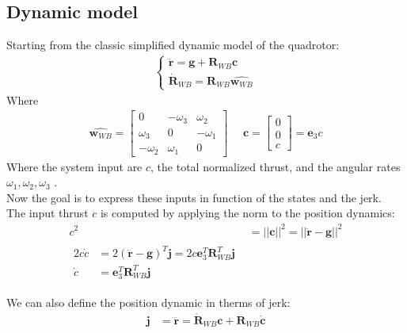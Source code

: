 \subsection{Dynamic model}
Starting from the classic simplified dynamic model of the quadrotor:
\begin{align}
\begin{cases}
\ddot{\boldsymbol{r}} = \boldsymbol{g} + \boldsymbol{R}_{WB}\boldsymbol{c}  \\[10pt]
\dot{\boldsymbol{R}}_{WB} = \boldsymbol{R}_{WB}\hat{\boldsymbol{w}_{WB}}
\end{cases}
\label{eq:dynamic_jerk}
\end{align}
Where 
\begin{align}
\hat{\boldsymbol{w}_{WB}} =
{\begin{bmatrix}
0 & -\omega_3 & \omega_2 \\[10pt]
\omega_3 & 0 & -\omega_1 \\[10pt]
-\omega_2 & \omega_1  & 0
\end{bmatrix}} \ \ \ \ \ \ \boldsymbol{c} = 
{\begin{bmatrix}
0 \\[10pt]
0 \\[10pt]
c
\end{bmatrix}} = \boldsymbol{e}_3c
\end{align}
Where the system input are  $c$, the total normalized thrust, and the angular rates $\omega_1,\omega_2,\omega_3$ .\\

Now the goal is to express these inputs in function of the states and the jerk.\\
 
The input thrust $c$ is computed by applying the norm to the position dynamics:
\begin{align}
c^2 &= ||\boldsymbol{c}||^2 =  ||\ddot{\boldsymbol{r}} - \boldsymbol{g}||^2 \\[20pt] \label{eq:thrust_from_jerk}
\begin{split}
2c\dot{c} &= 2(\ddot{\boldsymbol{r}} - \boldsymbol{g})^T \boldsymbol{j} = 2 c\boldsymbol{e}_3^T\boldsymbol{R}_{WB}^T \boldsymbol{j}   \\[10pt]
\dot{c} &= \boldsymbol{e}_3^T\boldsymbol{R}_{WB}^T \boldsymbol{j} 
\end{split}
\end{align}

We can also define the position dynamic in therms of jerk:
\begin{align}
\boldsymbol{j} &= \dddot{\boldsymbol{r}} = \dot{\boldsymbol{R}}_{WB}\boldsymbol{c} + \boldsymbol{R}_{WB}\dot{\boldsymbol{c}}
\end{align}

